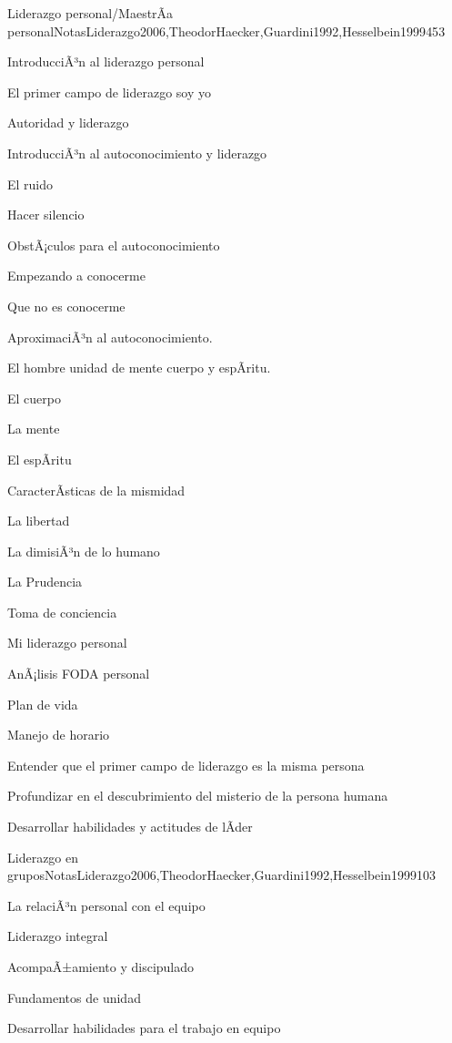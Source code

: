 \begin{syllabus}
\begin{unit}{Liderazgo personal/MaestrÃ­a personal}{NotasLiderazgo2006,TheodorHaecker,Guardini1992,Hesselbein1999}{45}{3}
\begin{topics}
	\item IntroducciÃ³n al liderazgo personal
	\item El primer campo de liderazgo soy yo
	\item Autoridad y liderazgo
	\item IntroducciÃ³n al autoconocimiento y liderazgo
	\item El ruido
	\item Hacer silencio
	\item ObstÃ¡culos para el autoconocimiento
	\item Empezando a conocerme
	\item Que no es conocerme
	\item AproximaciÃ³n al autoconocimiento.
	\item El hombre unidad de mente cuerpo y espÃ­ritu.
	\item El cuerpo
	\item La mente
	\item El espÃ­ritu
	\item CaracterÃ­sticas de la mismidad
	\item La libertad
	\item La dimisiÃ³n de lo humano
	\item La Prudencia
	\item Toma de conciencia
	\item Mi liderazgo personal
	\item AnÃ¡lisis FODA personal
	\item Plan de vida
	\item Manejo de horario
\end{topics}
\begin{unitgoals}
	\item Entender que el primer campo de liderazgo es la misma persona
	\item Profundizar en el descubrimiento del misterio de la persona humana
	\item Desarrollar habilidades y actitudes de lÃ­der
\end{unitgoals}
\end{unit}

\begin{unit}{Liderazgo en grupos}{NotasLiderazgo2006,TheodorHaecker,Guardini1992,Hesselbein1999}{10}{3}
\begin{topics}
	\item La relaciÃ³n personal con el equipo
	\item Liderazgo integral
	\item AcompaÃ±amiento y discipulado
	\item Fundamentos de unidad
\end{topics}
\begin{unitgoals}
	\item Desarrollar habilidades para el trabajo en equipo
\end{unitgoals}
\end{unit}




\end{syllabus}
